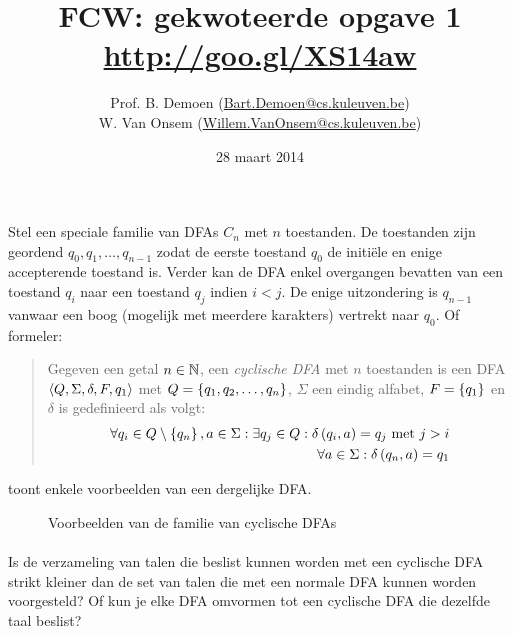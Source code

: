\documentclass{article}
\title{FCW: gekwoteerde opgave 1\\\url{http://goo.gl/XS14aw}}
\author{Prof. B. Demoen (\url{Bart.Demoen@cs.kuleuven.be})\\ W. Van Onsem (\url{Willem.VanOnsem@cs.kuleuven.be})}
\date{28 maart 2014}
\begin{document}
\maketitle
\richtlijnen{}
\aboutanswers{}
\begin{question}Stel een speciale familie van DFAs $C_n$ met $n$ toestanden. De toestanden zijn geordend $q_0,q_1,\ldots,q_{n-1}$ zodat de eerste toestand $q_0$ de initi\"ele en enige accepterende toestand is. Verder kan de DFA enkel overgangen bevatten van een toestand $q_i$ naar een toestand $q_j$ indien $i<j$. De enige uitzondering is $q_{n-1}$ vanwaar een boog (mogelijk met meerdere karakters) vertrekt naar $q_0$. Of formeler:
\begin{quote}\begin{definition}
Gegeven een getal $n\in\mathbb{N}$, een \emph{cyclische DFA} met $n$ toestanden is een DFA $\left\langle Q,\Sigma,\delta,F,q_1 \right\rangle$ met $Q=\left\{ q_1,q_2,\ldots,q_n \right\}$, $\Sigma$ een eindig alfabet, $F=\left\{ q_1 \right\}$ en $\delta$ is gedefinieerd als volgt:
\begin{eqnarray}
\forall q_i\in Q\setminus\left\{ q_n \right\},a\in\Sigma:\exists q_j\in Q:\delta\left( q_i,a \right)=q_j\mbox{ met } j>i\\
\forall a\in\Sigma:\delta\left( q_n,a \right)=q_1
\end{eqnarray}
\end{definition}\end{quote}
\begin{example}
 toont enkele voorbeelden van een dergelijke DFA.
\begin{figure}[hbt]
\centering
{}
\caption{Voorbeelden van de familie van cyclische DFAs}
\end{figure}
\end{example}
\paragraph{}
Is de verzameling van talen die beslist kunnen worden met een cyclische DFA strikt kleiner dan de set van talen die met een normale DFA kunnen worden voorgesteld? Of kun je elke DFA omvormen tot een cyclische DFA die dezelfde taal beslist?


\end{question}
\end{document}

